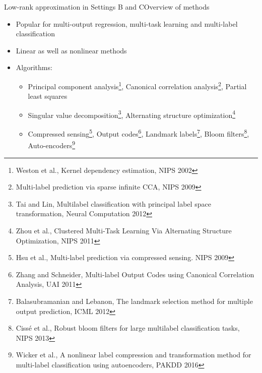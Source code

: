 \documentclass[]{beamer}
\begin{document}
\begin{frame}{Low-rank approximation in Settings B and C}{Overview of methods}

\begin{itemize}
\item Popular for multi-output regression, multi-task learning and multi-label classification
\item Linear as well as nonlinear methods
\item Algorithms: 
\begin{itemize}
\item Principal component analysis\footnote{Weston et al., Kernel dependency estimation, NIPS 2002}, Canonical correlation analysis\footnote{Multi-label prediction via sparse infinite CCA, NIPS 2009}, Partial least squares
\item Singular value decomposition\footnote{Tai and Lin, Multilabel classification with principal label space transformation, Neural Computation 2012}, Alternating structure optimization\footnote{Zhou et al., Clustered Multi-Task Learning Via Alternating Structure Optimization, NIPS 2011}
\item Compressed sensing\footnote{Hsu et al., Multi-label prediction via compressed sensing. NIPS 2009}, Output codes\footnote{Zhang and Schneider, Multi-label Output Codes using Canonical Correlation Analysis, UAI 2011}, Landmark labels\footnote{Balasubramanian and Lebanon, The landmark selection method for multiple output
prediction, ICML 2012}, Bloom filters\footnote{Ciss\'e et al., Robust bloom filters for large multilabel
classification tasks, NIPS 2013}, Auto-encoders\footnote{Wicker et al., A nonlinear label compression and transformation
method for multi-label classification using autoencoders, PAKDD 2016}
\end{itemize}
\end{itemize}
\vspace{0.3cm}
\end{frame}

\end{document}
